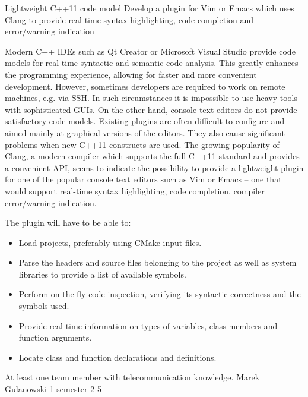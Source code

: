 \begin{project}
{Lightweight C++11 code model}
{Develop a plugin for Vim or Emacs which uses Clang to provide real-time
syntax highlighting, code completion and error/warning indication} 
{ 
Modern C++ IDEs such as Qt Creator or Microsoft Visual Studio provide code
models for real-time syntactic and semantic code analysis. This greatly enhances 
the programming experience, allowing for faster and more convenient development. 
However, sometimes developers are required to work on remote machines, e.g. via SSH. 
In such circumstances it is impossible to use heavy tools with sophisticated GUIs. 
On the other hand, console text editors do not provide satisfactory code models. 
Existing plugins are often difficult to configure and aimed mainly at graphical versions of the editors. 
They also cause significant problems when new C++11 constructs are used. The growing popularity of Clang,
a modern compiler which supports the full C++11 standard and provides a convenient API, seems to indicate 
the possibility to provide a lightweight plugin for one of the popular console text editors such as Vim or 
Emacs – one that would support real-time syntax highlighting, code completion, compiler error/warning indication. 
 
The plugin will have to be able to:
\begin{itemize}
	\item Load projects, preferably using CMake input files.
	\item Parse the headers and source files belonging to the project as well as
	system libraries to provide a list of available symbols.
	\item Perform on-the-fly code inspection, verifying its syntactic correctness and the symbols used.
	\item Provide real-time information on types of variables, class members and function arguments.
	\item Locate class and function declarations and definitions.
\end{itemize} 
 }
{At least one team member with telecommunication knowledge.}
{Marek Gulanowski}
{1 semester}
{2-5}
\end{project}
